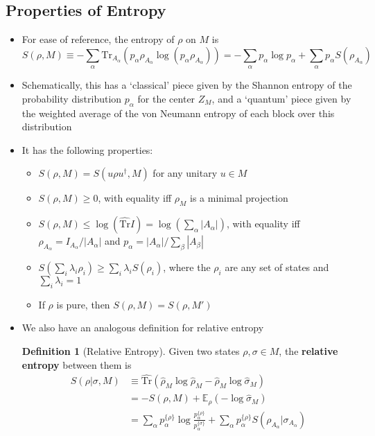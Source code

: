 \documentclass[12pt,a4paper]{article}
\numberwithin{equation}{section}
\newcommand{\ntr}{\hat{\text{Tr}}}
\theoremstyle{definition}
\newtheorem{definition}{Definition}[section]
\theoremstyle{theorem}
\begin{document}
	\subsection{Properties of Entropy}
	\begin{itemize}
		\item For ease of reference, the entropy of $\rho$ on $M$ is
		\begin{equation}
			S(\rho,M)\equiv-\sum_{\alpha}\text{Tr}_{A_{\alpha}}\left(p_{\alpha}\rho_{A_{\alpha}}\log(p_{\alpha}\rho_{A_{\alpha}})\right)=-\sum_{\alpha}p_{\alpha}\log{p_{\alpha}}+\sum_{\alpha}p_{\alpha}S(\rho_{A_{\alpha}})
		\end{equation}
		\item Schematically, this has a `classical' piece given by the Shannon entropy of the probability distribution $p_{\alpha}$ for the center $Z_{M}$, and a `quantum' piece given by the weighted average of the von Neumann entropy of each block over this distribution
		\item It has the following properties:
		\begin{itemize}
			\item $S(\rho,M)=S(u\rho u^{\dagger},M)$ for any unitary $u\in M$
			\item $S(\rho,M)\geq 0$, with equality iff $\rho_{M}$ is a minimal projection
			\item $S(\rho,M)\leq\log\left(\ntr I\right)=\log\left(\sum_{\alpha}|A_{\alpha}|\right)$, with equality iff $\rho_{A_{\alpha}}=I_{A_{\alpha}}/|A_{\alpha}|$ and $p_{\alpha}=|A_{\alpha}|/\sum_{\beta}|A_{\beta}|$
			\item $S\left(\sum_{i}\lambda_{i}\rho_{i}\right)\geq\sum_{i}\lambda_{i}S(\rho_{i})$, where the $\rho_{i}$ are any set of states and $\sum_{i}\lambda_{i}=1$
			\item If $\rho$ is pure, then $S(\rho,M)=S(\rho,M')$
		\end{itemize}
		\item We also have an analogous definition for relative entropy
		\begin{definition}[Relative Entropy]
			Given two states $\rho,\sigma\in M$, the \textbf{relative entropy} between them is
			\begin{equation}
				\begin{aligned}
					S(\rho|\sigma,M)&\equiv\ntr\left(\hat{\rho}_{M}\log\hat{\rho}_{M}-\hat{\rho}_{M}\log\hat{\sigma}_{M}\right)\\&=-S(\rho,M)+\mathbb{E}_{\rho}(-\log\hat{\sigma}_{M})\\&=\sum_{\alpha}p_{\alpha}^{\{\rho\}}\log\frac{p_{\alpha}^{\{\rho\}}}{p_{\alpha}^{\{\sigma\}}}+\sum_{\alpha}p_{\alpha}^{\{\rho\}}S(\rho_{A_{\alpha}}|\sigma_{A_{\alpha}})

\end{aligned}
\end{equation}
\end{definition}
\end{itemize}
\end{document}
